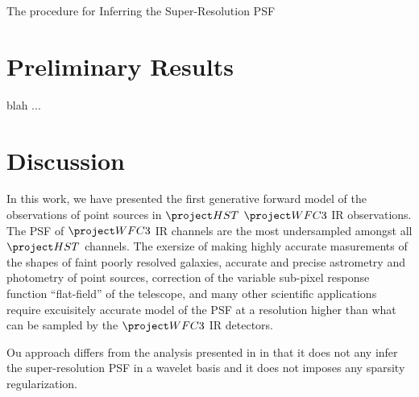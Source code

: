 \begin{algorithm} 
\caption{The procedure for Inferring the Super-Resolution PSF}
\begin{algorithmic}[1] \label{alg:supermean}
   \STATE // \emph{This can now be done in parallel for all i}
   \STATE $b_{n}$ \gets {} \; $(y_{n})$
   \STATE $f_{n}$ \gets $\sum_{i=1}^{N_pix} \big(y_{n,i} - b_{n}\big)$
   \STATE {} $\Delta_{n}$ with the 3  polynomial method
   \STATE $X_{n}$ \gets {} $(\Delta_n)[\big(y_{n,i} - b_{n}\big)/f_n]$
\ENDFOR
\STATE $X$ \gets $\sum_{n=1}^{N} X_{n]$
\ENDIF
\IF{$t=2,...,N_{it}:$}
\FOR{$i=1,...,N$}
   \STATE // \emph{This loop can now be done in parallel for all i}
   \WHILE{$\rho(X,D)>\epsilon_t$}
   \STATE Draw $\pars^{*}_{t}$ from $\{\pars_{t-1}\}$ with probabilities $\{w_{t-1}\}$
   \STATE $\pars^{*}_{t} \gets K(\pars^{*}_{t},.)$
   \STATE $X = f(\pars^{*}_{t})$
   \ENDWHILE
   \STATE $\pars^{(i)}_{t} \gets \pars^{*}_{t}$
   \STATE $w^{(i)}_{t} \gets \pi(\pars^{(i)}_{t}) / \big(\sum\limits_{j=1}^{N}w_{t-1}^{(i)}K(\pars^{(j)}_{t-1},\pars^{(i)}_{t}) \big)$
\ENDFOR
\ENDIF
\end{algorithmic}
\end{algorithm}

\section{Preliminary Results}\label{sec:results}

blah ...

\section{Discussion}\label{sec:summary}

In this work, we have presented the first generative forward model of the observations of point sources in $\hst$ $\wfc$ IR 
observations. The PSF of $\wfc$ IR channels are the most undersampled amongst all $\hst$ channels. 
The exersize of making highly accurate masurements of the shapes of faint poorly resolved galaxies, accurate and precise astrometry and photometry of point sources, 
correction of the variable sub-pixel response function ``flat-field'' of the telescope, and many other scientific applications require excuisitely accurate model of 
the PSF at a resolution higher than what can be sampled by the $\wfc$ IR detectors. 

Ou approach differs from the analysis presented in \citep{ngole,ngole2} in that it does not any infer the super-resolution PSF in a wavelet basis and it does not 
imposes any sparsity regularization. 




